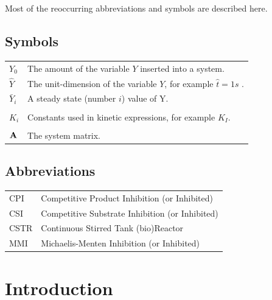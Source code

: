 \documentclass[a4paper, 10pt, twoside, openright]{book}
\begin{document}
Most of the reoccurring abbreviations and symbols are described here.


\section*{Symbols}

\begin{tabular}{ll}
$Y_0$      & The amount of the variable $Y$ inserted into a system.\\
$\hat Y$& The unit-dimension of the variable $Y$, for example $\hat t=1s$ .\\
$\bar Y_i$ & A steady state (number $i$) value of Y.\\
\phantom{a}& \phantom{b} \\
$K_i$ & Constants used in kinetic expressions, for example $K_I$.\\
\phantom{a}& \phantom{b} \\
$\mathbf{A}$     & The system matrix. \\
\end{tabular}

\section*{Abbreviations}

\begin{tabular}{ll}
CPI      & Competitive Product Inhibition (or Inhibited)\index{CPI}\\
CSI      & Competitive Substrate Inhibition (or Inhibited)\index{CSI}\\
CSTR     & Continuous Stirred Tank (bio)Reactor\index{CSTR}\\
MMI      & Michaelis-Menten Inhibition (or Inhibited)\index{MMI}
\end{tabular}


\tableofcontents 
\begin{samepage}
\listoffigures
\let\clearpage\relax
\listoftables
\end{samepage}


\mainmatter


\chapter{Introduction}
\end{document}

